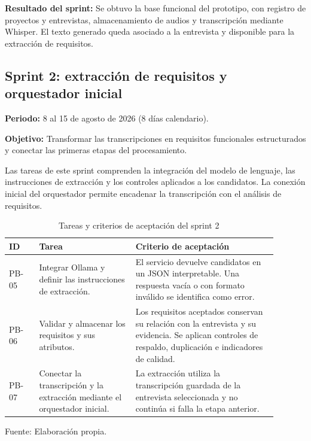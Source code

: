 \noindent\textbf{Resultado del sprint:}
Se obtuvo la base funcional del prototipo, con registro
de proyectos y entrevistas, almacenamiento de audios
y transcripción mediante Whisper. El texto generado
queda asociado a la entrevista y disponible para
la extracción de requisitos.

\subsection{Sprint 2: extracción de requisitos y orquestador inicial}

\noindent\textbf{Periodo:}
8 al 15 de agosto de 2026
(8 días calendario).

\medskip
\noindent\textbf{Objetivo:}
Transformar las transcripciones en requisitos
funcionales estructurados y conectar las primeras
etapas del procesamiento.

Las tareas de este sprint comprenden la integración
del modelo de lenguaje, las instrucciones de extracción
y los controles aplicados a los candidatos.
La conexión inicial del orquestador permite encadenar
la transcripción con el análisis de requisitos.

\begin{table}[H]
    \centering
    \caption{Tareas y criterios de aceptación del sprint 2}
    \label{tab:sprint-2}
    \begingroup
    \small
    \setlength{\tabcolsep}{5pt}
    \renewcommand{\arraystretch}{1.15}
    \begin{tabular}{
        |>{\raggedright\arraybackslash}p{0.10\linewidth}
        |>{\raggedright\arraybackslash}p{0.32\linewidth}
        |>{\raggedright\arraybackslash}p{0.47\linewidth}|
    }
        \hline
        \textbf{ID} &
        \textbf{Tarea} &
        \textbf{Criterio de aceptación} \\
        \hline
        PB-05 &
        Integrar Ollama y definir las instrucciones
        de extracción. &
        El servicio devuelve candidatos en un JSON
        interpretable. Una respuesta vacía o con
        formato inválido se identifica como error. \\
        \hline
        PB-06 &
        Validar y almacenar los requisitos
        y sus atributos. &
        Los requisitos aceptados conservan su
        relación con la entrevista y su evidencia.
        Se aplican controles de respaldo,
        duplicación e indicadores de calidad. \\
        \hline
        PB-07 &
        Conectar la transcripción y la extracción
        mediante el orquestador inicial. &
        La extracción utiliza la transcripción
        guardada de la entrevista seleccionada
        y no continúa si falla la etapa anterior. \\
        \hline
    \end{tabular}

    \par\smallskip
    \begin{minipage}{0.95\linewidth}
        \footnotesize Fuente: Elaboración propia.
    \end{minipage}
    \endgroup
\end{table}

